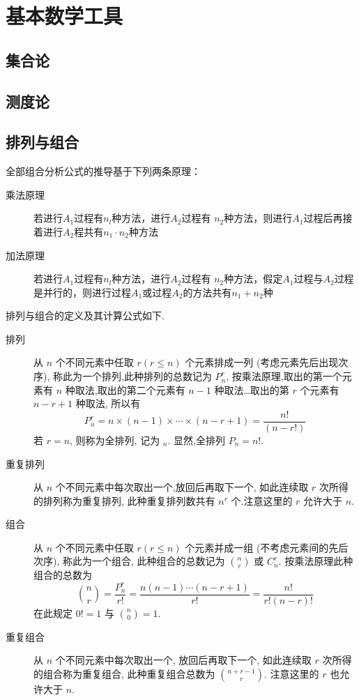 \chapter{基本数学工具}

\section{集合论}

\section{测度论}



\section{排列与组合}

全部组合分析公式的推导基于下列两条原理：
\begin{description}
  \item[乘法原理] 若进行$A_1$过程有$n_l$种方法，进行$A_2$过程有 $n_2$种方法，则进行$A_1$过程后再接着进行$A_2$程共有$n_1 \cdot  n_2$种方法
  \item[加法原理] 若进行$A_1$过程有$n_l$种方法，进行$A_2$过程有 $n_2$种方法，假定$A_1$过程与$A_2$过程是并行的，则进行过程$A_1$或过程$A_2$的方法共有$n_1 +n_2$种
\end{description}

排列与组合的定义及其计算公式如下.
\begin{description}
  \item [排列]  从 $n$ 个不同元素中任取 $r (r \le n)$ 个元素排成一列 (考虑元素先后出现次序), 称此为一个排列,此种排列的总数记为 $P_n^r$, 按乘法原理,取出的第一个元素有 $n$ 种取法,取出的第二个元素有 $n - 1$ 种取法\dots 取出的第 $r$ 个元素有 $n - r + 1$ 种取法, 所以有
        \[ P_n^r = n \times (n - 1) \times \dotsb \times (n - r + 1) = \frac{n!}{(n - r!)} \]
        若 $r = n$, 则称为全排列, 记为 $_n$. 显然,全排列 $P_n = n!$.
  \item [重复排列]  从 $n$ 个不同元素中每次取出一个,放回后再取下一个,  如此连续取 $r$ 次所得的排列称为重复排列, 此种重复排列数共有 $n^r$ 个.注意这里的 $r$ 允许大于 $n$.
  \item [组合]   从 $n$ 个不同元素中任取 $r (r \le n)$ 个元素并成一组 (不考虑元素间的先后次序), 称此为一个组合, 此种组合的总数记为 $\binom{n}{r}$ 或 $C_n^r$. 按乘法原理此种组合的总数为
        \[ \binom{n}{r} = \frac{P_n^r}{r!} = \frac{n (n - 1) \dotsb (n - r + 1)}{r!} = \frac{n!}{r! (n - r)!} \]
        在此规定 $0! = 1$ 与 $\binom{n}{0} = 1$.
  \item [重复组合] 从 $n$ 个不同元素中每次取出一个, 放回后再取下一个, 如此连续取 $r$ 次所得的组合称为重复组合, 此种重复组合总数为 $\binom{n + r - 1}{r}$. 注意这里的 $r$ 也允许大于 $n$.
\end{description}

